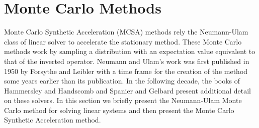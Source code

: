 \documentclass{snamc2013}
\begin{document}
\section{Monte Carlo Methods}
Monte Carlo Synthetic Acceleration (MCSA) methods rely the
Neumann-Ulam class of linear solver to accelerate the stationary
method. These Monte Carlo methods work by sampling a distribution with
an expectation value equivalent to that of the inverted
operator. Neumann and Ulam's work was first published in 1950 by
Forsythe and Leibler \cite{forsythe_matrix_1950} with a time frame for
the creation of the method some years earlier than its publication. In
the following decade, the books of Hammersley and Handscomb
\cite{hammersley_monte_1964} and Spanier and Gelbard
\cite{spanier_monte_1969} present additional detail on these solvers.
In this section we briefly present the Neumann-Ulam Monte Carlo method
for solving linear systems and then present the Monte Carlo Synthetic
Acceleration method.
\end{document}
